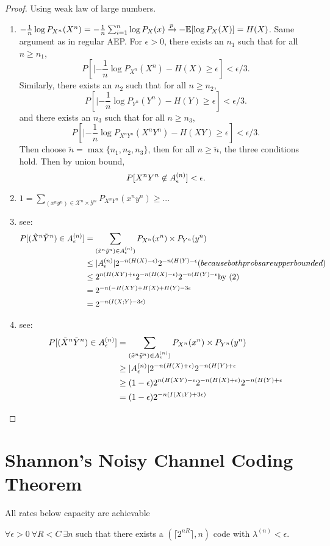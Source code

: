 \begin{proof}
Using weak law of large numbers.
\begin{enumerate}
\item $-\frac{1}{n} \log P_{X^n}(X^n) = - \frac{1}{n} \sum_{i=1}^n \log P_X(x) \xrightarrow{p} - \mathbb{E}[\log P_X(X)] = H(X)$. Same argument as in regular AEP. For $\epsilon > 0$, there exists an $n_1$ such that for all $n \geq n_1$,
\[
P[|-\frac{1}{n} \log P_{X^n}(X^n) - H(X) \geq \epsilon] < \epsilon/3.
\]
Similarly, there exists an $n_2$ such that for all $n \geq n_2$,
\[
P[|-\frac{1}{n} \log P_{Y^n}(Y^n) - H(Y) \geq \epsilon] < \epsilon/3.
\]
and there exists an $n_3$ such that for all $n \geq n_3$,
\[
P[|-\frac{1}{n} \log P_{X^nY^n}(X^nY^n) - H(XY) \geq \epsilon] < \epsilon/3.
\]
Then choose $\tilde{n} = \max\{n_1,n_2,n_3\}$, then for all $n \geq \tilde{n}$, the three conditions hold. Then by union bound,
\[
P[X^nY^n \not\in A_{\epsilon}^{(n)}] < \epsilon.
\]
\item $1 = \sum_{(x^ny^n) \in \mathcal{X}^n \times \mathcal{Y}^n} P_{X^nY^n}(x^ny^n) \geq ...$
\item see:
\begin{align*}
P[(\tilde{X}^n\tilde{Y}^n) \in A_{\epsilon}^{(n)}] &= \sum_{(\tilde{x}^n\tilde{y}^n) \in A_{\epsilon}^{(n)})} P_{X^n}(x^n) \times P_{Y^n}(y^n)\\
&\leq |A_{\epsilon}^{(n)}| 2^{-n(H(X) - \epsilon)}2^{-n(H(Y) - \epsilon} \mbox(because both probs are upper bounded)\\
&\leq 2^{n(H(XY) + \epsilon}2^{-n(H(X) - \epsilon)}2^{-n(H(Y) - \epsilon} \mbox{by (2)}\\
&= 2^{-n(-H(XY) +H(X) + H(Y) - 3\epsilon}\\
&= 2^{-n(I(X;Y) - 3\epsilon)}
\end{align*}
\item see:
\begin{align*}
P[(\tilde{X}^n\tilde{Y}^n) \in A_{\epsilon}^{(n)}] &= \sum_{(\tilde{x}^n\tilde{y}^n) \in A_{\epsilon}^{(n)})} P_{X^n}(x^n) \times P_{Y^n}(y^n)\\
&\geq |A_{\epsilon}^{(n)}| 2^{-n(H(X) + \epsilon)}2^{-n(H(Y) + \epsilon}\\
&\geq (1-\epsilon)2^{n(H(XY) - \epsilon}2^{-n(H(X) + \epsilon)}2^{-n(H(Y) + \epsilon}\\
&= (1-\epsilon)2^{-n(I(X;Y) + 3\epsilon)}
\end{align*}

\end{enumerate}
\end{proof}

\section{Shannon's Noisy Channel Coding Theorem}

All rates below capacity are achievable
\begin{theorem}
$\forall \epsilon > 0 \ \forall R < C \ \exists n$ such that there exists a $(\lceil 2^{nR}\rceil, n)$ code with $\lambda^{(n)} < \epsilon$.
\end{theorem}